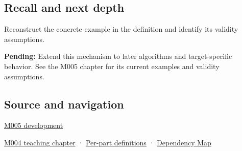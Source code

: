 \subsection{Recall and next depth}\label{appendix-f11d1a521253-recall-and-next-depth}

Reconstruct the concrete example in the definition and identify its validity assumptions.

\textbf{Pending:} Extend this mechanism to later algorithms and target-specific behavior. See the M005 chapter for its current examples and validity assumptions.

\subsection{Source and navigation}\label{appendix-f11d1a521253-source-and-navigation}

\hyperref[01-foundations-i-ch001-when-arithmetic-meets-uncertainty]{M005 development}

\hyperref[01-foundations-i-ch001-a-stretching-ruler-for-real-valued-quantities]{M004 teaching chapter} · \hyperref[appendix-fd090d982a15-m004---parts-61-76]{Per-part definitions} · \hyperref[appendix-4ad47bdd269a]{Dependency Map}
